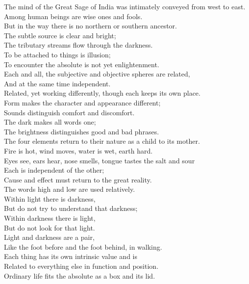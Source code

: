 \documentclass[12pt]{report}
\begin{document}
The mind of the Great Sage of India was intimately conveyed from west to east.\\
Among human beings are wise ones and fools.\\
But in the way there is no northern or southern ancestor.\\
The subtle source is clear and bright;\\
The tributary streams flow through the darkness.\\
To be attached to things is illusion;\\
To encounter the absolute is not yet enlightenment.\\
Each and all, the subjective and objective spheres are related,\\
And at the same time independent.\\
Related, yet working differently, though each keeps its own place.\\
Form makes the character and appearance different;\\
Sounds distinguish comfort and discomfort.\\
The dark makes all words one;\\
The brightness distinguishes good and bad phrases.\\
The four elements return to their nature as a child to its mother.\\
Fire is hot, wind moves, water is wet, earth hard.\\
Eyes see, ears hear, nose smells, tongue tastes the salt and sour\\
Each is independent of the other;\\
Cause and effect must return to the great reality.\\
The words high and low are used relatively.\\
Within light there is darkness,\\
But do not try to understand that darkness;\\
Within darkness there is light,\\
But do not look for that light.\\
Light and darkness are a pair,\\
Like the foot before and the foot behind, in walking.\\
Each thing has its own intrinsic value and is\\
Related to everything else in function and position.\\
Ordinary life fits the absolute as a box and its lid.\\
\end{document}
